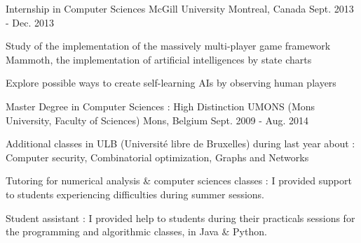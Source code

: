 

\begin{cventries}

\cventry
{Internship in Computer Sciences} %
{McGill University} %
{Montreal, Canada} %
{Sept. 2013 - Dec. 2013} %
{
  \begin{cvitems} %
    \item {Study of the implementation of the massively multi-player game framework Mammoth, the implementation of artificial intelligences by state charts}
    \item {Explore possible ways to create self-learning AIs by observing human players}
  \end{cvitems}
}


\cventry
{Master Degree in Computer Sciences : High Distinction} %
{UMONS (Mons University, Faculty of Sciences)} %
{Mons, Belgium} %
{Sept. 2009 - Aug. 2014} %
{
  \begin{cvitems} %
    \item {Additional classes in ULB (Université libre de Bruxelles) during last year about : Computer security, Combinatorial optimization, Graphs and Networks}
     \item {Tutoring for numerical analysis \& computer sciences classes : I provided support to students experiencing difficulties during summer sessions.}
     \item {Student assistant : I provided help to students during their practicals sessions for the programming and algorithmic classes, in Java \& Python.}
  \end{cvitems}
}




\end{cventries}
